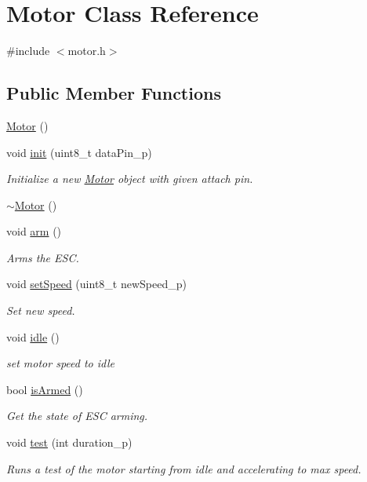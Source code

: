 \hypertarget{class_motor}{}\section{Motor Class Reference}
\label{class_motor}


{\ttfamily \#include $<$motor.\+h$>$}

\subsection*{Public Member Functions}
\begin{DoxyCompactItemize}
\item 
\hyperlink{class_motor_af6106b4c506411265c5face762b6c004}{Motor} ()
\item 
void \hyperlink{class_motor_a62bf4d19aed7729c5dd4a2c1148c86f8}{init} (uint8\+\_\+t data\+Pin\+\_\+p)
\begin{DoxyCompactList}\small\item\em Initialize a new \hyperlink{class_motor}{Motor} object with given attach pin. \end{DoxyCompactList}\item 
\hyperlink{class_motor_a2e57c7b2681efea1d3b7f253ee88ecd4}{$\sim$\+Motor} ()
\item 
void \hyperlink{class_motor_af21376271175d094adf9a077f70d2208}{arm} ()
\begin{DoxyCompactList}\small\item\em Arms the E\+SC. \end{DoxyCompactList}\item 
void \hyperlink{class_motor_a0d852462f8afab5d980d2507d1915447}{set\+Speed} (uint8\+\_\+t new\+Speed\+\_\+p)
\begin{DoxyCompactList}\small\item\em Set new speed. \end{DoxyCompactList}\item 
void \hyperlink{class_motor_a0cffd54bdf0fa79b4ac7bae5ffd9a103}{idle} ()
\begin{DoxyCompactList}\small\item\em set motor speed to idle \end{DoxyCompactList}\item 
bool \hyperlink{class_motor_a9f6e92bbf36d9f68665bc1e02af075b6}{is\+Armed} ()
\begin{DoxyCompactList}\small\item\em Get the state of E\+SC arming. \end{DoxyCompactList}\item 
void \hyperlink{class_motor_a0c2e15bba82f033dafb3b45ea874692f}{test} (int duration\+\_\+p)
\begin{DoxyCompactList}\small\item\em Runs a test of the motor starting from idle and accelerating to max speed. \end{DoxyCompactList}\end{DoxyCompactItemize}


